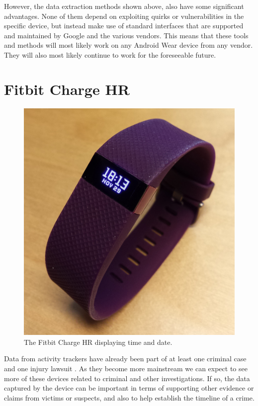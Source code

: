 \documentclass[a4paper,11pt,dvips]{article}
\begin{document}
However, the data extraction methods shown above, also have some significant advantages. None of them depend on exploiting quirks or vulnerabilities in the specific device, but instead make use of standard interfaces that are supported and maintained by Google and the various vendors. This means that these tools and methods will most likely work on any Android Wear device from any vendor. They will also most likely continue to work for the foreseeable future.


\section{Fitbit Charge HR}
\begin{figure}
	\begin{center}
		\includegraphics[natwidth=1000bp,natheight=1019bp,width=0.8\linewidth]{fitbit_charge_hr}
	\end{center}
	\caption{The Fitbit Charge HR displaying time and date.}
	\label{fig:fitbit_charge_hr}
\end{figure}
Data from activity trackers have already been part of at least one criminal case \citep{Snyder:2015} and one injury lawsuit \citep{Olson:2014}. As they become more mainstream we can expect to see more of these devices related to criminal and other investigations. If so, the data captured by the device can be important in terms of supporting other evidence or claims from victims or suspects, and also to help establish the timeline of a crime.
\end{document}
